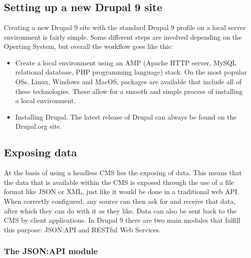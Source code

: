 
\chapter{}
\label{ch:proofofconcept}

\section{Setting up a new Drupal 9 site}

Creating a new Drupal 9 site with the standard Drupal 9 profile on a local server environment is fairly simple. Some different steps are involved depending on the Operting System, but overall the workflow goes like this: 
\begin{itemize}
	\item Create a local environment using an AMP (Apache HTTP server, MySQL relational database, PHP programming language) stack. On the most popular OSs, Linux, Windows and MacOS, packages are available that include all of these technologies. These allow for a smooth and simple process of installing a local environment.
	\item Installing Drupal. The latest release of Drupal can always be found on the Drupal.org site.
\end{itemize}

\section{Exposing data}

At the basis of using a headless CMS lies the exposing of data. This means that the data that is available within the CMS is exposed through the use of a file format like JSON or XML, just like it would be done in a traditional web API. When correctly configured, any source can then ask for and receive that data, after which they can do with it as they like. Data can also be sent back to the CMS by client applications. In Drupal 9 there are two main modules that fulfill this purpose: JSON:API and RESTful Web Services.

\subsection{The JSON:API module}

